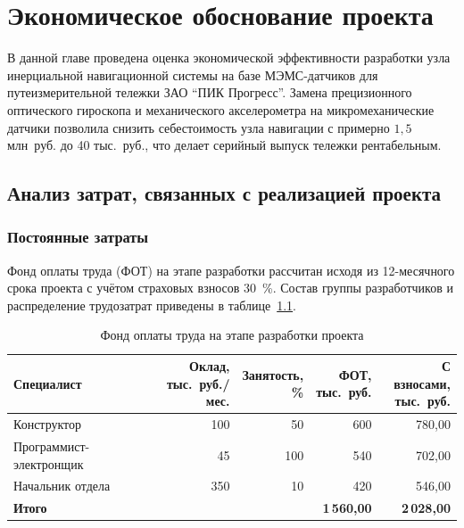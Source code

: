 \chapter{Экономическое обоснование проекта}
\label{chap:economy}

В данной главе проведена оценка экономической эффективности разработки узла инерциальной навигационной системы на базе МЭМС-датчиков для путеизмерительной тележки ЗАО \enquote{ПИК Прогресс}. Замена прецизионного оптического гироскопа и механического акселерометра на микромеханические датчики позволила снизить себестоимость узла навигации с примерно $1{,}5$ млн~руб. до 40 тыс.~руб., что делает серийный выпуск тележки рентабельным.


\section{Анализ затрат, связанных с реализацией проекта}
\label{sec:economy_costs}

\subsection{Постоянные затраты}
\label{subsec:fixed_costs}

Фонд оплаты труда (ФОТ) на этапе разработки рассчитан исходя из 12-месячного срока проекта с учётом страховых взносов 30~\%. Состав группы разработчиков и распределение трудозатрат приведены в таблице~\ref{table:economy_payroll}.

\begin{table}[ht]
	\centering
	\small
	\begin{tabular}{|l|r|r|r|r|}
		\hline
		Специалист 					& \makecell{Оклад,\\ тыс.~руб./мес.} & \makecell{Занятость,\\ \%} & \makecell{ФОТ,\\ тыс.~руб.} & \makecell{С взносами,\\ тыс.~руб.} \\
		\hline
		Конструктор 				& 100 & 50  & 600  & 780,00 \\
		Программист-электронщик 	& 45  & 100 & 540  & 702,00 \\
		Начальник отдела 			& 350 & 10  & 420  & 546,00 \\
		\hline
		\textbf{Итого} 				&     &     & \textbf{1\,560,00} & \textbf{2\,028,00} \\
		\hline
	\end{tabular}
	\caption{Фонд оплаты труда на этапе разработки проекта}
	\label{table:economy_payroll}
\end{table}

